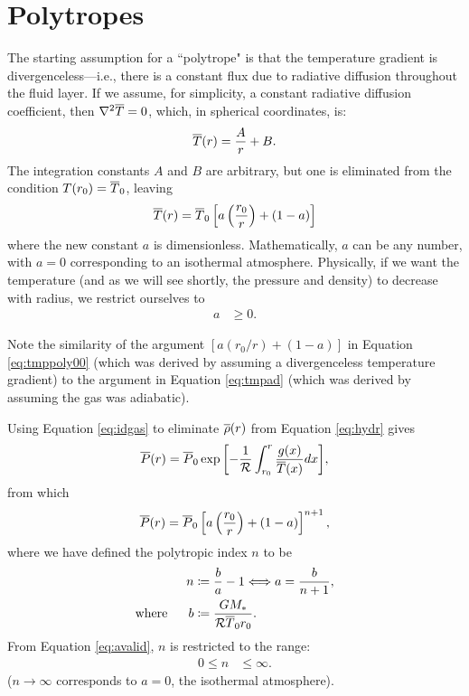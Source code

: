 \documentclass[12pt]{article} %
\begin{document}
\section{Polytropes}
The starting assumption for a ``polytrope" is that the temperature gradient is divergenceless---i.e., there is a constant flux due to radiative diffusion throughout the fluid layer. If we assume, for simplicity, a constant radiative diffusion coefficient, then $\nabla^2\overline{T}=0$, which, in spherical coordinates, is: 
\begin{align*}
\overline{T}(r) = \frac{A}{r} + B.
\end{align*}
The integration constants $A$ and $B$ are arbitrary, but one is eliminated from the condition $T(r_0) = \overline{T}_0$, leaving
\begin{align}
\overline{T}(r) = \overline{T}_0 \left[a\left(\frac{r_0}{r}\right) + (1 - a)\right]
\label{eq:tmppoly00}
\end{align}
where the new constant $a$ is dimensionless. Mathematically, $a$ can be any number, with $a=0$ corresponding to an isothermal atmosphere. Physically, if we want the temperature (and as we will see shortly, the pressure and density) to decrease with radius, we restrict ourselves to 
\begin{align}\label{eq:avalid}
	a&\geq0. 
\end{align}

Note the similarity of the argument $[a(r_0/r) + (1-a)]$ in Equation \eqref{eq:tmppoly00} (which was derived by assuming a divergenceless temperature gradient) to the argument in Equation \eqref{eq:tmpad} (which was derived by assuming the gas was adiabatic). 

Using Equation \eqref{eq:idgas} to eliminate $\overline{\rho}(r)$ from Equation \eqref{eq:hydr} gives
\begin{align*}
\overline{P}(r) = \overline{P}_0\exp{\left[-\frac{1}{\mathcal{R}}\int_{r_0}^r\frac{g(x)}{\overline{T}(x)}dx\right]},
\end{align*}
from which
\begin{align*}
\overline{P}(r) = \overline{P}_0\left[a\left(\frac{r_0}{r}\right) + (1 - a)\right]^{n+1},
\end{align*}
where we have defined the polytropic index $n$ to be
\begin{align}
n&\coloneqq \frac{b}{a} - 1 \Longleftrightarrow a = \frac{b}{n+1},\label{eq:npoly}\\
\text{where}\ \ \ \ \  b&\coloneqq \frac{GM_*}{\mathcal{R} \overline{T}_0 r_0}.\label{eq:bpoly}
\end{align}
From Equation \eqref{eq:avalid}, $n$ is restricted to the range:
\begin{align}\label{eq:nvalid}
	0\leq n&\leq\infty. 
\end{align}
($n\rightarrow\infty$ corresponds to $a=0$, the isothermal atmosphere). 
\end{document}
